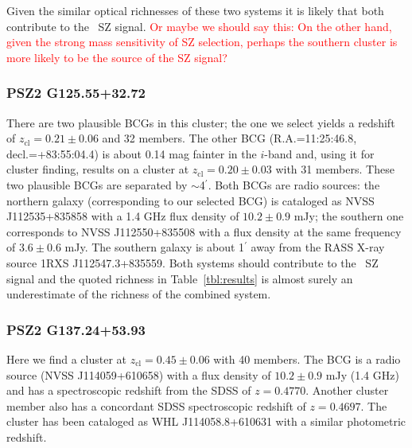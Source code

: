 \documentclass[apj, revtex4-1]{emulateapj}
\newcommand{\editorial}[1]{\textcolor{red}{#1}}
\begin{document}
Given the similar optical richnesses of these two systems it is likely that both contribute to the \planck\ SZ signal. \editorial{Or maybe we should say this: On the other hand, given the strong mass sensitivity of SZ selection, perhaps the southern cluster is more likely to be the source of the SZ signal?}

\subsubsection{PSZ2 G125.55+32.72} %
There are two plausible BCGs in this cluster; the one we select yields a redshift of $z_\mathrm{cl} = 0.21 \pm 0.06$ and 32 members. The other BCG (R.A.=11:25:46.8, decl.=+83:55:04.4) is about 0.14 mag fainter in the $i$-band and, using it for cluster finding, results on a cluster at $z_\mathrm{cl} = 0.20 \pm 0.03$ with 31 members. These two plausible BCGs are separated by $\sim$4$^\prime$. Both BCGs are radio sources: the northern galaxy (corresponding to our selected BCG) is cataloged as NVSS J112535+835858 with a 1.4 GHz flux density of $10.2 \pm 0.9$ mJy; the southern one corresponds to NVSS J112550+835508 with a flux density at the same frequency of $3.6 \pm 0.6$ mJy. The southern galaxy is about 1$^\prime$ away from the RASS X-ray source 1RXS J112547.3+835559. Both systems should contribute to the \planck\ SZ signal and the quoted richness in Table~\ref{tbl:results} is almost surely an underestimate of the richness of the combined system.


\subsubsection{PSZ2 G137.24+53.93} %
Here we find a cluster at $z_\mathrm{cl} = 0.45 \pm 0.06$ with 40 members. The BCG is a radio source (NVSS J114059+610658) with a flux density of $10.2 \pm 0.9$ mJy (1.4 GHz) and has a spectroscopic redshift from the SDSS of $z=0.4770$. Another cluster member also has a concordant SDSS spectroscopic redshift of $z=0.4697$. The cluster has been cataloged as WHL J114058.8+610631 with a similar photometric redshift.
\end{document}
